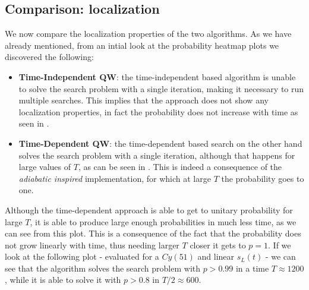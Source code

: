     \clearpage
    \subsection{Comparison: localization}\label{subsec:localization_results}
        We now compare the localization properties of the two algorithms. As we have already mentioned, from an intial look at the probability heatmap plots we discovered the following:
        \begin{itemize}
            \item \textbf{Time-Independent QW}: the time-independent based algorithm is unable to solve the search problem with a single iteration, making it necessary to run multiple searches. This implies that the approach does not show any localization properties, in fact the probability does not increase with time as seen in .
            \item \textbf{Time-Dependent QW}: the time-dependent based search on the other hand solves the search problem with a single iteration, although that happens for large values of $T$, as can be seen in . This is indeed a consequence of the \textit{adiabatic inspired} implementation, for which at large $T$ the probability goes to one.
        \end{itemize}
        

        \clearpage
        \noindent
        Although the time-dependent approach is able to get to unitary probability for large $T$, it is able to produce large enough probabilities in much less time, as we can see from this plot. This is a consequence of the fact that the probability does not grow linearly with time, thus needing larger $T$ closer it gets to $p=1$. If we look at the following plot - evaluated for a $Cy(51)$ and linear $s_L(t)$ - we can see that the algorithm solves the search problem with $p>0.99$ in a time $T\approx 1200$, while it is able to solve it with $p>0.8$ in $T/2 \approx 600$.
        

        \clearpage
